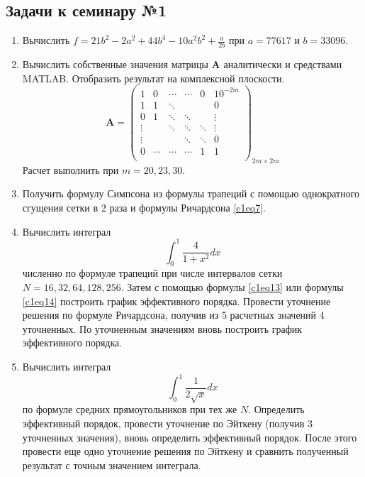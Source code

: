 \subsection{Задачи к семинару №1}
\begin{enumerate}
\item Вычислить $\displaystyle f = 21b^2 - 2a^2 + 44b^4 - 10a^2b^2 + \frac{a}{2b}$ при $a = 77617$ и $b = 33096$.
\item Вычислить собственные значения матрицы $\mathbf{A}$ аналитически и средствами MATLAB. Отобразить результат на комплексной плоскости.
\begin{equation} \nonumber
	\mathbf{A} = 
	\begin{pmatrix}
		1 & 0 & \cdots & \cdots & 0 & 10^{-2m} \\
		1 & 1 & \ddots &  &  & 0 \\
		0 & 1 & \ddots &  \ddots &  & \vdots \\
		\vdots &  & \ddots & \ddots & \ddots & \vdots \\
		\vdots &  &  & \ddots & \ddots & 0 \\
		0 & \cdots & \cdots &  \cdots & 1 & 1 \\
	\end{pmatrix}_{2m \times 2m}
\end{equation}
Расчет выполнить при $m = 20,23,30$.
\item Получить формулу Симпсона из формулы трапеций с помощью однократного сгущения сетки в 2 раза и формулы Ричардсона \eqref{c1eq7}.
\item Вычислить интеграл 
\begin{equation} \nonumber
	\int_{0}^{1} \frac{4}{1 + x^2} dx
\end{equation}
численно по формуле трапеций при числе интервалов сетки $N = 16,32,64,128,256$. Затем с помощью формулы \eqref{c1eq13} или формулы \eqref{c1eq14} построить график эффективного порядка. Провести уточнение решения по формуле Ричардсона, получив из 5 расчетных значений 4 уточненных. По уточненным значениям вновь построить график эффективного порядка.
\item Вычислить интеграл 
\begin{equation} \nonumber
	\int_{0}^{1} \frac{1}{2 \sqrt{x}} dx
\end{equation}
по формуле средних прямоугольников при тех же $N$. Определить эффективный порядок, провести уточнение по Эйткену (получив 3 уточненных значения), вновь определить эффективный порядок. После этого провести еще одно уточнение решения по Эйткену и сравнить полученный результат с точным значением интеграла.
\end {enumerate}